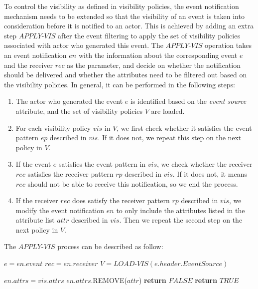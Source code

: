 To control the visibility as defined in visibility policies, the event notification mechanism needs to be extended so that the visibility of an event is taken into consideration before it is notified to an actor. This is achieved by adding an extra step $APPLY\textrm{-}VIS$ after the event filtering to apply the set of visibility policies associated with actor who generated this event. The $APPLY\textrm{-}VIS$ operation takes an event notification $en$ with the information about the corresponding event $e$ and the receiver $rec$ as the parameter, and decide on whether the notification should be delivered and whether the attributes need to be filtered out based on the visibility policies. In general, it can be performed in the following steps:

\begin{enumerate}
	\item The actor who generated the event $e$ is identified based on the \emph{event source} attribute, and the set of visibility policies $V$ are loaded. 
	\item For each visibility policy $vis$ in $V$, we first check whether it satisfies the event pattern $ep$ described in $vis$. If it does not, we repeat this step on the next policy in $V$.
	\item If the event $e$ satisfies the event pattern in $vis$, we check whether the receiver $rec$ satisfies the receiver pattern $rp$ described in $vis$. If it does not, it means $rec$ should not be able to receive this notification, so we end the process.
	\item If the receiver $rec$ does satisfy the receiver pattern $rp$ described in $vis$, we modify the event notification $en$ to only include the attributes listed in the attribute list $attr$ described in $vis$. Then we repeat the second step on the next policy in $V$.
\end{enumerate}

The $APPLY\textrm{-}VIS$ process can be described as follow:
{\footnotesize
\begin{algorithm}
\begin{algorithmic}[1]
	\State $e = en.event$
	\State $rec = en.receiver$
	\State $V = LOAD\textrm{-}VIS(e.header.EventSource)$
	
					\State $en.attrs = vis.attrs$
				\Else
				    		\State $en.attrs$.REMOVE($attr$)
				    	\EndIf	
				    \EndFor	
				\EndIf
			\Else	
				\State \textbf{return} $FALSE$ 
			\EndIf
		\EndIf
	\EndFor
	\State \textbf{return} $TRUE$ 
\EndProcedure
\end{algorithmic}
\end{algorithm}
}
